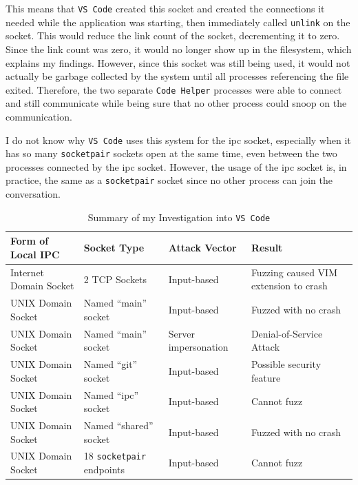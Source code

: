 This means that \texttt{VS Code} created this socket and created the connections it needed while the application was starting, then immediately called \texttt{unlink} on the socket.  This would reduce the link count of the socket, decrementing it to zero.  Since the link count was zero, it would no longer show up in the filesystem, which explains my findings.  However, since this socket was still being used, it would not actually be garbage collected by the system until all processes referencing the file exited.  Therefore, the two separate \texttt{Code Helper} processes were able to connect and still communicate while being sure that no other process could snoop on the communication.

I do not know why \texttt{VS Code} uses this system for the ipc socket, especially when it has so many \texttt{socketpair} sockets open at the same time, even between the two processes connected by the ipc socket.  However, the usage of the ipc socket is, in practice, the same as a \texttt{socketpair} socket since no other process can join the conversation.

\begin{table}
\centering
\begin{scriptsize}
\begin{tabular}{ l | l | l | l }
\textbf{Form of Local IPC} & \textbf{Socket Type} & \textbf{Attack Vector} & \textbf{Result} \\ \hline
Internet Domain Socket & 2 TCP Sockets & Input-based & Fuzzing caused VIM extension to crash \\ \hline
UNIX Domain Socket & Named ``main'' socket & Input-based & Fuzzed with no crash \\ \hline
UNIX Domain Socket & Named ``main'' socket & Server impersonation & Denial-of-Service Attack \\ \hline
UNIX Domain Socket & Named ``git'' socket & Input-based & Possible security feature \\ \hline
UNIX Domain Socket & Named ``ipc'' socket & Input-based & Cannot fuzz \\ \hline
UNIX Domain Socket & Named ``shared'' socket & Input-based & Fuzzed with no crash \\ \hline
UNIX Domain Socket & 18 \texttt{socketpair} endpoints & Input-based & Cannot fuzz \\ \hline
\end{tabular}
\caption{Summary of my Investigation into \texttt{VS Code}}
\label{tab:codeData}
\end{scriptsize}
\end{table} 

